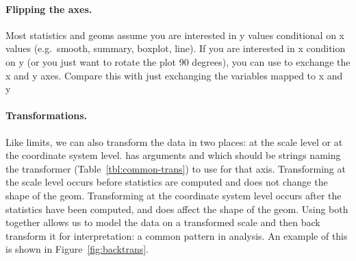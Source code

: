 \paragraph{Flipping the axes.}  Most statistics and geoms assume you are interested in y values conditional on x values (e.g.\ smooth, summary, boxplot, line).  If you are interested in x condition on y (or you just want to rotate the plot 90 degrees), you can use  to exchange the x and y axes.  Compare this with just exchanging the variables mapped to x and y

% 


\paragraph{Transformations.}  Like limits, we can also transform the data in two places: at the scale level or at the coordinate system level.  has arguments  and  which should be strings naming the transformer (Table~\ref{tbl:common-trans}) to use for that axis. Transforming at the scale level occurs before statistics are computed and does not change the shape of the geom.  Transforming at the coordinate system level occurs after the statistics have been computed, and does affect the shape of the geom.  Using both together allows us to model the data on a transformed scale and then back transform it for interpretation: a common pattern in analysis.  An example of this is shown in Figure~\ref{fig:backtrans}.

% 


